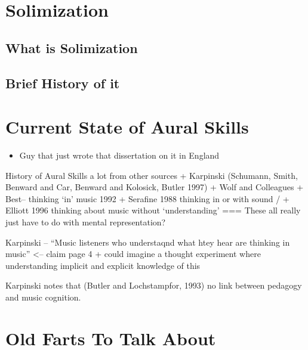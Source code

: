 \documentclass[]{book}
\providecommand{\tightlist}{%
  \setlength{\itemsep}{0pt}\setlength{\parskip}{0pt}}
\theoremstyle{definition}
\theoremstyle{definition}
\theoremstyle{definition}
\theoremstyle{remark}
\begin{document}
\hypertarget{solimization}{%
\section{Solimization}\label{solimization}}

\hypertarget{what-is-solimization}{%
\subsection{What is Solimization}\label{what-is-solimization}}

\hypertarget{brief-history-of-it}{%
\subsection{Brief History of it}\label{brief-history-of-it}}

\hypertarget{current-state-of-aural-skills}{%
\section{Current State of Aural
Skills}\label{current-state-of-aural-skills}}

\begin{itemize}
\tightlist
\item
  Guy that just wrote that dissertation on it in England
\end{itemize}

History of Aural Skills a lot from other sources + Karpinski (Schumann,
Smith, Benward and Car, Benward and Kolosick, Butler 1997) + Wolf and
Colleagues + Best-- thinking `in' music 1992 + Serafine 1988 thinking in
or with sound / + Elliott 1996 thinking about music without
`understanding' === These all really just have to do with mental
representation?

Karpinski -- ``Music listeners who understaqnd what htey hear are
thinking in music'' \textless{}-- claim page 4 + could imagine a thought
experiment where understanding implicit and explicit knowledge of this

Karpinski notes that (Butler and Lochstampfor, 1993) no link between
pedagogy and music cognition.

\hypertarget{old-farts-to-talk-about}{%
\section{Old Farts To Talk About}\label{old-farts-to-talk-about}}
\end{document}
